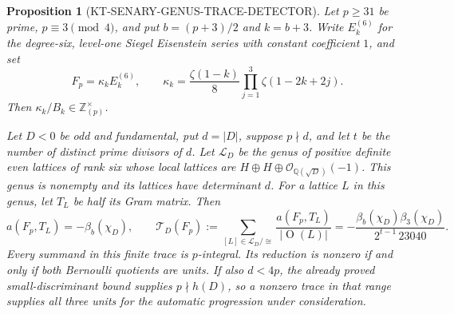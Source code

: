 \documentclass[11pt,a4paper]{article}
\newtheorem{proposition}[theorem]{Proposition}
\theoremstyle{definition}
\begin{document}
\begin{proposition}[KT-SENARY-GENUS-TRACE-DETECTOR]
Let $p\geq31$ be prime, $p\equiv3\pmod4$, and put
$b=(p+3)/2$ and $k=b+3$.  Write $E_k^{(6)}$ for the degree-six,
level-one Siegel Eisenstein series with constant coefficient $1$, and set
\begin{equation}
 F_p=\kappa_k E_k^{(6)},\qquad
 \kappa_k=\frac{\zeta(1-k)}8
                  \prod_{j=1}^3\zeta(1-2k+2j).
 \tag{SG.1}
\end{equation}
Then $\kappa_k/B_k\in\mathbb Z_{(p)}^\times$.

Let $D<0$ be odd and fundamental, put $d=|D|$, suppose $p\nmid d$,
and let $t$ be the number of distinct prime divisors of $d$.
Let $\mathcal L_D$ be the genus of positive definite even lattices of
rank six whose local lattices are
$H\oplus H\oplus\mathcal O_{\mathbb Q(\sqrt D)}(-1)$.
This genus is nonempty and its lattices have determinant $d$.
For a lattice $L$ in this genus, let $T_L$ be half its Gram matrix.
Then
\begin{equation}
 a(F_p,T_L)=-\beta_b(\chi_D),\qquad
 \mathcal T_D(F_p):=
  \sum_{[L]\in\mathcal L_D/\cong}
             \frac{a(F_p,T_L)}{|\operatorname O(L)|}
 =-\frac{\beta_b(\chi_D)\beta_3(\chi_D)}
                    {2^{t-1}\,23040}.
 \tag{SG.2}
\end{equation}
Every summand in this finite trace is $p$-integral.  Its reduction is
nonzero if and only if both Bernoulli quotients are units.  If also
$d<4p$, the already proved small-discriminant bound supplies
$p\nmid h(D)$, so a nonzero trace in that range supplies all three
units for the automatic progression under consideration.
\end{proposition}
\end{document}
